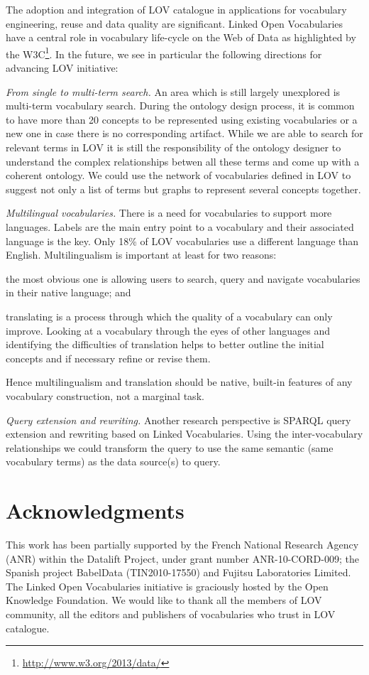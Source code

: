 \documentclass{iosart2c}
\begin{document}
The adoption and integration of LOV catalogue in applications for vocabulary engineering, reuse and data quality are significant. Linked Open Vocabularies have a central role in vocabulary life-cycle on the Web of Data as highlighted by the W3C\footnote{\url{http://www.w3.org/2013/data/}}. In the future, we see in particular the following directions for advancing LOV initiative:

\emph{From single to multi-term search.} An area which is still largely unexplored is multi-term vocabulary search. During the ontology design process, it is common to have more than 20 concepts to be represented using existing vocabularies or a new one in case there is no corresponding artifact. While we are able to search for relevant terms in LOV it is still the responsibility of the ontology designer to understand the complex relationships betwen all these terms and come up with a coherent ontology. We could use the network of vocabularies defined in LOV to suggest not only a list of terms but graphs to represent several concepts together.

\emph{Multilingual vocabularies.} There is a need for vocabularies to support more languages. Labels are the main entry point to a vocabulary and their associated language is the key. Only 18\% of LOV vocabularies use a different language than English. Multilingualism is important at least for two reasons: 
\begin{inparaenum}[1)] 
	\item the most obvious one is allowing users to search, query and navigate vocabularies in their native language; and
	\item translating is a process through which the quality of a vocabulary can only improve. Looking at a vocabulary through the eyes of other languages and identifying the difficulties of translation helps to better outline the initial concepts and if necessary refine or revise them. 
\end{inparaenum} 
Hence multilingualism and translation should be native, built-in features of any vocabulary construction, not a marginal task.

\emph{Query extension and rewriting.} Another research perspective is SPARQL query extension and rewriting based on Linked Vocabularies. Using the inter-vocabulary relationships we could transform the query to use the same semantic (same vocabulary terms) as the data source(s) to query.

\section*{Acknowledgments}
This work has been partially supported by the French National Research Agency (ANR) within the Datalift Project, under grant number ANR-10-CORD-009; the Spanish project BabelData (TIN2010-17550) and Fujitsu Laboratories Limited. The Linked Open Vocabularies initiative is graciously hosted by the Open Knowledge Foundation. We would like to thank all the members of LOV community, all the editors and publishers of vocabularies who trust in LOV catalogue. 




\end{document}
